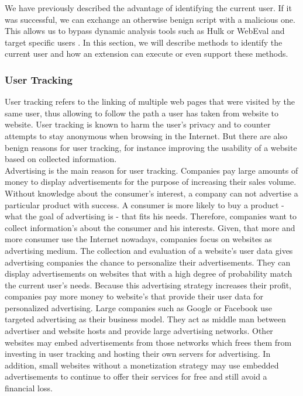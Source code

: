 		We have previously described the advantage of identifying the current user. If it was successful, we can exchange an otherwise benign script with a malicious one. This allows us to bypass dynamic analysis tools such as Hulk or WebEval and target specific users \cite{184485, 190984}. In this section, we will describe methods to identify the current user and how an extension can execute or even support these methods. 
		
		\subsubsection{User Tracking}
	
			User tracking refers to the linking of multiple web pages that were visited by the same user, thus allowing to follow the path a user has taken from website to website. User tracking is known to harm the user's privacy and to counter attempts to stay anonymous when browsing in the Internet. %
			But there are also benign reasons for user tracking, for instance improving the usability of a website based on collected information. \\ 
			
			Advertising is the main reason for user tracking. Companies pay large amounts of money to display advertisements for the purpose of increasing their sales volume. Without knowledge about the consumer's interest, a company can not advertise a particular product with success. A consumer is more likely to buy a product - what the goal of advertising is - that fits his needs. Therefore, companies want to collect information's about the consumer and his interests. Given, that more and more consumer use the Internet nowadays, companies focus on websites as advertising medium. The collection and evaluation of a website's user data gives advertising companies the chance to personalize their advertisements. They can display advertisements on websites that with a high degree of probability match the current user's needs. Because this advertising strategy increases their profit, companies pay more money to website's that provide their user data for personalized advertising. Large companies such as Google or Facebook use targeted advertising as their business model. They act as middle man between advertiser and website hosts and provide large advertising networks. Other websites may embed advertisements from those networks which frees them from investing in user tracking and hosting their own servers for advertising. In addition, small websites without a monetization strategy may use embedded advertisements to continue to offer their services for free and still avoid a financial loss. \\
			
